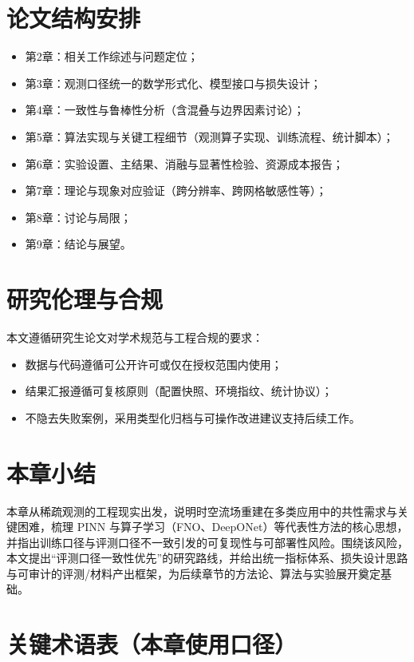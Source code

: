 \section{论文结构安排}

\begin{itemize}
  \item 第2章：相关工作综述与问题定位；
  \item 第3章：观测口径统一的数学形式化、模型接口与损失设计；
  \item 第4章：一致性与鲁棒性分析（含混叠与边界因素讨论）；
  \item 第5章：算法实现与关键工程细节（观测算子实现、训练流程、统计脚本）；
  \item 第6章：实验设置、主结果、消融与显著性检验、资源成本报告；
  \item 第7章：理论与现象对应验证（跨分辨率、跨网格敏感性等）；
  \item 第8章：讨论与局限；
  \item 第9章：结论与展望。
\end{itemize}

\section{研究伦理与合规}

本文遵循研究生论文对学术规范与工程合规的要求：
\begin{itemize}
  \item 数据与代码遵循可公开许可或仅在授权范围内使用；
  \item 结果汇报遵循可复核原则（配置快照、环境指纹、统计协议）；
  \item 不隐去失败案例，采用类型化归档与可操作改进建议支持后续工作。
\end{itemize}

\section{本章小结}

本章从稀疏观测的工程现实出发，说明时空流场重建在多类应用中的共性需求与关键困难，梳理 PINN 与算子学习（FNO、DeepONet）等代表性方法的核心思想，并指出训练口径与评测口径不一致引发的可复现性与可部署性风险。围绕该风险，本文提出“评测口径一致性优先”的研究路线，并给出统一指标体系、损失设计思路与可审计的评测/材料产出框架，为后续章节的方法论、算法与实验展开奠定基础。

\section{关键术语表（本章使用口径）}

